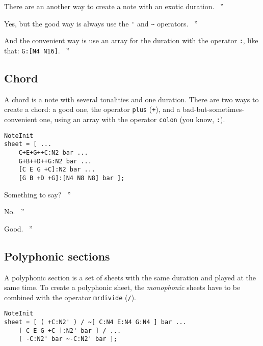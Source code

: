 \documentclass{article}
\newenvironment{meenv}{ \par \noindent \makebox[6em][r]{ \textcolor{mecolor}{Me}: `` --~}}{~''}
\newenvironment{myselfenv}{ \par \noindent \makebox[6em][r]{ \textcolor{myselfcolor}{Myself}: `` --~}}{~''}
\newcommand{ \me }[1]{%
\begin{meenv}%
	#1%
\end{meenv} }
\newcommand{ \myself }[1]{%
\begin{myselfenv}%
	#1%
\end{myselfenv} }
\begin{document}
\me{There are an another way to create a note with an exotic duration.}
\begin{myselfenv}%
	Yes, but the good way is always use the \lstinline!'! and \lstinline!~! operators.%
\end{myselfenv}
\begin{meenv}%
	And the convenient way is use an array for the duration with the operator \lstinline!:!, like that: \lstinline!G:[N4 N16]!.%
\end{meenv}

\subsection{Chord}

A chord is a note with several tonalities and one duration. There are two ways to create a chord: a good one, the operator \lstinline!plus! (\lstinline!+!), and a bad-but-sometimes-convenient one, using an array with the operator \lstinline!colon! (you know, \lstinline!:!). \\

\begin{lstlisting}
NoteInit
sheet = [ ...
	C+E+G++C:N2 bar ...
	G+B++D++G:N2 bar ...
	[C E G +C]:N2 bar ...
	[G B +D +G]:[N4 N8 N8] bar ];
\end{lstlisting}

\myself{Something to say?}
\me{No.}
\myself{Good.}

\subsection{Polyphonic sections}
\label{sec:TutoPolyphonic}

A polyphonic section is a set of sheets with the same duration and played at the same time. To create a polyphonic sheet, the \emph{monophonic} sheets have to be combined with the operator \lstinline!mrdivide! (\lstinline!/!). \\
\begin{lstlisting}
NoteInit
sheet = [ ( +C:N2' ) / ~[ C:N4 E:N4 G:N4 ] bar ...
	[ C E G +C ]:N2' bar ] / ...
	[ -C:N2' bar ~-C:N2' bar ];
\end{lstlisting}
\end{document}
